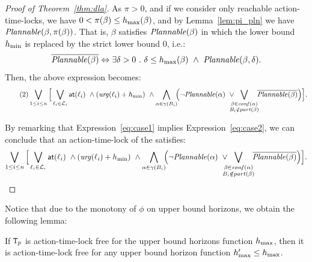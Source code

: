 \begin{proof}[Proof of Theorem~\ref{thm:dla}]
As $\pi > 0$, and if we consider only reachable action-time-locks, we have $0 < \pi(\beta) \leq
h_{\max}(\beta)$, and by Lemma~\ref{lem:pi_pln} we have $\mathit{Plannable(\beta,\pi(\beta))}$.
That is, $\beta$ satisfies  $\mathit{Plannable(\beta)}$ in which the lower bound $h_{\min}$ is replaced by the
strict lower bound 0, i.e.:
\begin{displaymath}
\overline{\plntxt{\beta}} \Leftrightarrow \exists \delta > 0\ . \ \delta \leq \hmax(\beta) \ 
  \wedge \ \plnIntxt{\beta}{\delta}.
\end{displaymath}
Then, the above expression becomes:
\begin{equation}
  \label{eq:case2}\tag{2}
  \bigvee_{1\le i\le n}\Big[\bigvee_{\loc_i \in \Loc_i}\al{\loc_i}\ \wedge(\urg(\loc_i)+\hmin) \
  \wedge\bigwedge_{\alpha \in \gamma(B_i)}\hspace*{-1ex}\Big(  \neg\plntxt{\alpha} \
  \vee\hspace*{-2ex}\bigvee_{\substack{\beta\in\confl(\alpha)\\B_i\notin\p{\beta}}}\hspace*{-1ex}
  \overline{\plntxt{\beta}} \Big)\Big].
\end{equation}

By remarking that Expression~\ref{eq:case1} implies Expression~\ref{eq:case2}, 
we can conclude that an action-time-lock of the \lps satisfies:
\begin{displaymath}
  \bigvee_{1\le i\le n}\Big[\bigvee_{\loc_i \in \Loc_i}\al{\loc_i}\ \wedge(\urg(\loc_i)+\hmin) \ 
  \wedge\bigwedge_{\alpha \in \gamma(B_i)}\hspace*{-1ex}\Big(  \neg\plntxt{\alpha} \
  \vee\hspace*{-2ex}\bigvee_{\substack{\beta\in\confl(\alpha)\\B_i\notin\p{\beta}}}\hspace*{-1ex}
  \overline{\plntxt{\beta}} \Big)\Big].
\end{displaymath}
\end{proof}

Notice that due to the monotony of $\phi$ on upper bound horizons, we obtain the following lemma:

\begin{lemma}\label{lemma:mon}
  If $\texttt{T}_p$ is action-time-lock free for the upper bound horizons function $h_{\max}$, 
  then it is action-time-lock free for any upper bound horizon function $h_{\max}'\le h_{\max}$.
\end{lemma}

